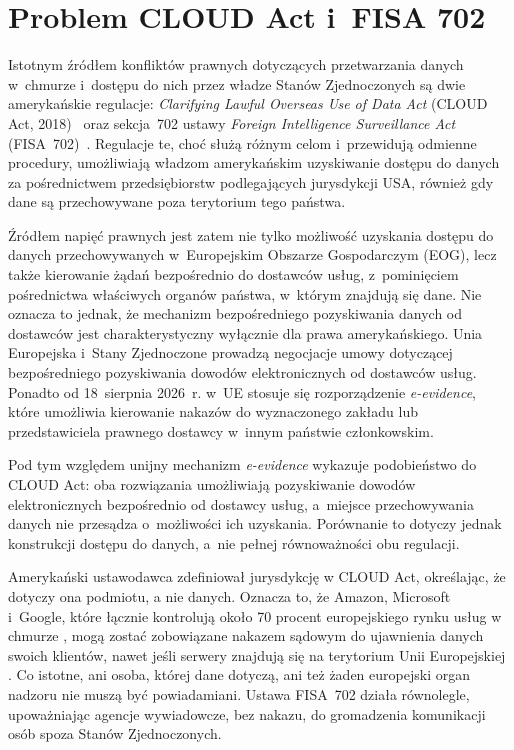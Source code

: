 \section{Problem CLOUD Act i~FISA 702}

Istotnym źródłem konfliktów prawnych dotyczących przetwarzania
danych w~chmurze i~dostępu do nich przez władze Stanów
Zjednoczonych są dwie amerykańskie regulacje:
\textit{Clarifying Lawful Overseas Use of Data Act}
(CLOUD Act, 2018)~\autocite{cloudact2018}
oraz sekcja~702 ustawy \textit{Foreign Intelligence
Surveillance Act} (FISA~702)~\autocite{fisa702}.
Regulacje te, choć służą różnym celom i~przewidują odmienne
procedury, umożliwiają władzom amerykańskim uzyskiwanie
dostępu do danych za pośrednictwem przedsiębiorstw
podlegających jurysdykcji USA, również gdy dane są
przechowywane poza terytorium tego państwa.

Źródłem napięć prawnych jest zatem nie tylko możliwość
uzyskania dostępu do danych przechowywanych w~Europejskim
Obszarze Gospodarczym (EOG), lecz także kierowanie żądań
bezpośrednio do dostawców usług, z~pominięciem pośrednictwa
właściwych organów państwa, w~którym znajdują się dane.
Nie oznacza to jednak, że mechanizm bezpośredniego
pozyskiwania danych od dostawców jest charakterystyczny
wyłącznie dla prawa amerykańskiego. Unia Europejska
i~Stany Zjednoczone prowadzą negocjacje umowy dotyczącej
bezpośredniego pozyskiwania dowodów elektronicznych
od dostawców usług. Ponadto od 18~sierpnia 2026~r.
w~UE stosuje się rozporządzenie \textit{e-evidence},
które umożliwia kierowanie nakazów do wyznaczonego
zakładu lub przedstawiciela prawnego dostawcy w~innym
państwie członkowskim.

Pod tym względem unijny mechanizm \textit{e-evidence}
wykazuje podobieństwo do CLOUD Act: oba rozwiązania
umożliwiają pozyskiwanie dowodów elektronicznych
bezpośrednio od dostawcy usług, a~miejsce przechowywania
danych nie przesądza o~możliwości ich uzyskania.
Porównanie to dotyczy jednak konstrukcji dostępu do danych,
a~nie pełnej równoważności obu regulacji.

Amerykański ustawodawca zdefiniował jurysdykcję w CLOUD Act, określając, że dotyczy ona podmiotu, a nie danych. Oznacza to, że Amazon, Microsoft i~Google, które łącznie kontrolują około 70 procent europejskiego rynku usług w chmurze \autocite{synergy2025eu}, mogą zostać zobowiązane nakazem sądowym do ujawnienia danych swoich klientów, nawet jeśli serwery znajdują się na terytorium Unii Europejskiej \autocite{edpb2019cloudact}. Co istotne, ani osoba, której dane
dotyczą, ani też żaden europejski organ nadzoru nie muszą być powiadamiani. Ustawa FISA~702 działa równolegle, upoważniając agencje wywiadowcze, bez nakazu, do gromadzenia komunikacji osób spoza Stanów Zjednoczonych.


